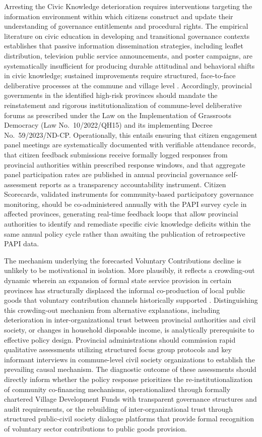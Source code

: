 \documentclass[12pt,a4paper]{article}
\begin{document}
Arresting the Civic Knowledge deterioration requires interventions targeting the information environment within which citizens construct and update their understanding of governance entitlements and procedural rights. The empirical literature on civic education in developing and transitional governance contexts establishes that passive information dissemination strategies, including leaflet distribution, television public service announcements, and poster campaigns, are systematically insufficient for producing durable attitudinal and behavioral shifts in civic knowledge; sustained improvements require structured, face-to-face deliberative processes at the commune and village level \citep{Fox2015, Bjorkman2009}. Accordingly, provincial governments in the identified high-risk provinces should mandate the reinstatement and rigorous institutionalization of commune-level deliberative forums as prescribed under the Law on the Implementation of Grassroots Democracy (Law No.\ 10/2022/QH15) and its implementing Decree No.\ 59/2023/ND-CP. Operationally, this entails ensuring that citizen engagement panel meetings are systematically documented with verifiable attendance records, that citizen feedback submissions receive formally logged responses from provincial authorities within prescribed response windows, and that aggregate panel participation rates are published in annual provincial governance self-assessment reports as a transparency accountability instrument. Citizen Scorecards, validated instruments for community-based participatory governance monitoring, should be co-administered annually with the PAPI survey cycle in affected provinces, generating real-time feedback loops that allow provincial authorities to identify and remediate specific civic knowledge deficits within the same annual policy cycle rather than awaiting the publication of retrospective PAPI data.

The mechanism underlying the forecasted Voluntary Contributions decline is unlikely to be motivational in isolation. More plausibly, it reflects a crowding-out dynamic wherein an expansion of formal state service provision in certain provinces has structurally displaced the informal co-production of local public goods that voluntary contribution channels historically supported \citep{Ostrom1990}. Distinguishing this crowding-out mechanism from alternative explanations, including deterioration in inter-organizational trust between provincial authorities and civil society, or changes in household disposable income, is analytically prerequisite to effective policy design. Provincial administrations should commission rapid qualitative assessments utilizing structured focus group protocols and key informant interviews in commune-level civil society organizations to establish the prevailing causal mechanism. The diagnostic outcome of these assessments should directly inform whether the policy response prioritizes the re-institutionalization of community co-financing mechanisms, operationalized through formally chartered Village Development Funds with transparent governance structures and audit requirements, or the rebuilding of inter-organizational trust through structured public-civil society dialogue platforms that provide formal recognition of voluntary sector contributions to public goods provision.
\end{document}
